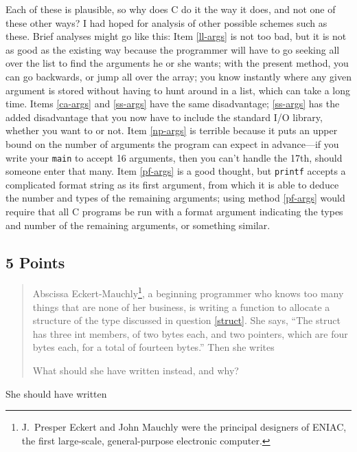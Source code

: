 Each of these is plausible, so why does C do it the way it does, and not
one of these other ways?  I had hoped for analysis of other possible
schemes such as these.  Brief analyses might go like this: Item
\ref{ll-args} is not too bad, but it is not as good as the existing way
because the programmer will have to go seeking all over the list to find
the arguments he or she wants; with the present method, you can go
backwards, or jump all over the array; you know instantly where any
given argument is stored without having to hunt around in a list, which
can take a long time.  Items \ref{ca-args} and \ref{ss-args} have the
same disadvantage; \ref{ss-args} has the added disadvantage that you now
have to include the standard I/O library, whether you want to or not.
Item \ref{np-args} is terrible because it puts an upper bound on the
number of arguments the program can expect in advance---if you write
your {\tt main} to accept 16 arguments, then you can't handle the 17th,
should someone enter that many.  Item \ref{pf-args} is a good thought,
but {\tt printf} accepts a complicated format string as its first
argument, from which it is able to deduce the number and types of the
remaining arguments; using method
\ref{pf-args} would require that all C programs be run with a format
argument indicating the types and number of the remaining arguments, or
something similar.

\subsection{5 Points}

\begin{quotation}
\small
Abscissa Eckert-Mauchly\footnote{J.~Presper Eckert and John Mauchly were
the principal designers of ENIAC, the first large-scale, general-purpose
electronic computer.}, a beginning programmer who knows too many
things that are none of her business, is writing a function to allocate
a structure of the type discussed in question \ref{struct}.  She says,
``The struct has three int members, of two bytes each, and two pointers,
which are four bytes each, for a total of fourteen bytes.''  Then she
writes

\begin{flushleft}
\verb% newnode = malloc(14); %
\end{flushleft}

What should she have written instead, and why?
\end{quotation}

She should have written

